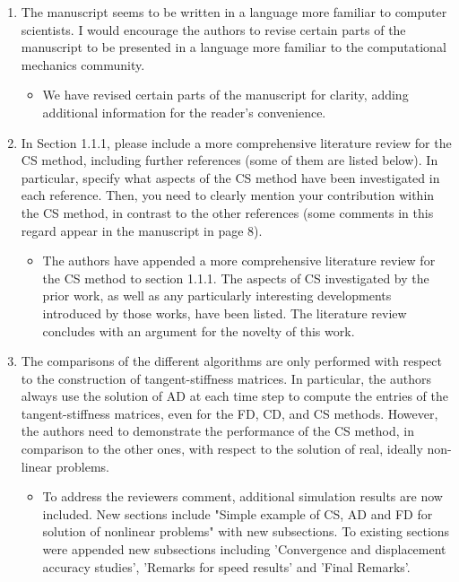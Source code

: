 \documentclass{article}
\begin{document}
\begin{enumerate}
    \item 
        The manuscript seems to be written in a language more familiar to computer scientists. 
        I would encourage the authors to revise certain parts of the manuscript to be
        presented in a language more familiar to the computational mechanics community.

{\color{red}
  \begin{itemize}
    \item We have revised certain parts of the manuscript for clarity, adding additional information for the reader's convenience.
  \end{itemize}
  }

  \item In Section 1.1.1, please include a more comprehensive literature review for
     the CS method, including further references (some of them are listed below).
     In particular, specify what aspects of the CS method have been investigated in
     each reference. Then, you need to clearly mention your contribution within
     the CS method, in contrast to the other references (some comments in this
     regard appear in the manuscript in page 8).

  {\color{red}
  \begin{itemize}
     \item The authors have appended a more comprehensive literature review for the CS method to section 1.1.1.  The aspects of CS investigated by the prior work, as well as any particularly interesting developments introduced by those works, have been listed. The literature review concludes with an argument for the novelty of this work.  
  \end{itemize}}


  \item
      The comparisons of the different algorithms are only performed with respect to the
      construction of tangent-stiffness matrices. In particular, the authors always use the
      solution of AD at each time step to compute the entries of the tangent-stiffness
      matrices, even for the FD, CD, and CS methods. However, the authors need to
      demonstrate the performance of the CS method, in comparison to the other ones,
      with respect to the solution of real, ideally non-linear problems. 

{\color{red}
  \begin{itemize}
    \item 
        To address the reviewers comment, additional simulation results are now included. New sections
        include "Simple example of CS, AD and FD for solution of nonlinear problems" with
        new subsections. To existing sections were appended new subsections
        including 'Convergence and displacement accuracy studies', 'Remarks for
        speed results' and 'Final Remarks'.
    \end{itemize}}


\end{enumerate}
\end{document}
